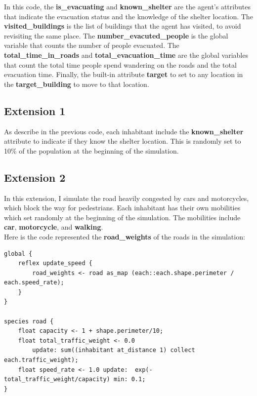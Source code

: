 \documentclass[12pt]{article}
\begin{document}
In this code, the \textbf{is\_evacuating} and \textbf{known\_shelter} are the agent's attributes that indicate the evacuation status and the knowledge of the shelter location. The \textbf{visited\_buildings} is the list of buildings that the agent has visited, to avoid revisiting the same place. The \textbf{number\_evacuted\_people} is the global variable that counts the number of people evacuated. The \textbf{total\_time\_in\_roads} and \textbf{total\_evacuation\_time} are the global variables that count the total time people spend wandering on the roads and the total evacuation time. Finally, the built-in attribute \textbf{target} to set to any location in the \textbf{target\_building} to move to that location. \\


\subsection{Extension 1}

As describe in the previous code, each inhabitant include the \textbf{known\_shelter} attribute to indicate if they know the shelter location. This is randomly set to 10\% of the population at the beginning of the simulation.


\subsection{Extension 2}

In this extension, I simulate the road heavily congested by cars and motorcycles, which block the way for pedestrians. Each inhabitant has their own mobilities which set randomly at the beginning of the simulation. The mobilities include \textbf{car}, \textbf{motorcycle}, and \textbf{walking}. \\

Here is the code represented the \textbf{road\_weights} of the roads in the simulation:
\begin{codebox}
\begin{lstlisting}[style=GAML]
global {
    reflex update_speed {
        road_weights <- road as_map (each::each.shape.perimeter / each.speed_rate);
    }
}

species road {
    float capacity <- 1 + shape.perimeter/10;
    float total_traffic_weight <- 0.0 
        update: sum((inhabitant at_distance 1) collect each.traffic_weight);
    float speed_rate <- 1.0 update:  exp(-total_traffic_weight/capacity) min: 0.1;
}
\end{lstlisting}
\end{codebox}
\end{document}

